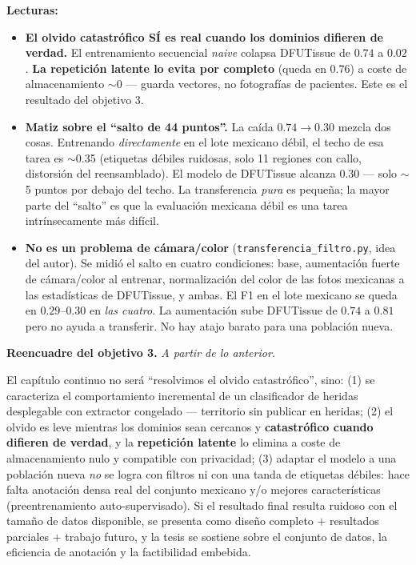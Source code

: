 \documentclass[12pt,letterpaper]{report}
\newcommand{\entrada}[2]{%
    \vspace{0.6em}
    \noindent\textbf{#1.} \textit{#2}
    \vspace{0.3em}
    \par
}
\begin{document}
\textbf{Lecturas:}
\begin{itemize}[leftmargin=1.5em]
    \item \textbf{El olvido catastrófico SÍ es real cuando los dominios difieren de verdad.} El
        entrenamiento secuencial \emph{naive} colapsa DFUTissue de $0.74$ a $0.02$. \textbf{La
        repetición latente lo evita por completo} (queda en $0.76$) a coste de almacenamiento
        $\sim$0 --- guarda vectores, no fotografías de pacientes. Este es el resultado del objetivo 3.
    \item \textbf{Matiz sobre el ``salto de 44 puntos''.} La caída $0.74 \to 0.30$ mezcla dos cosas.
        Entrenando \emph{directamente} en el lote mexicano débil, el techo de esa tarea es
        $\sim$0.35 (etiquetas débiles ruidosas, solo 11 regiones con callo, distorsión del
        reensamblado). El modelo de DFUTissue alcanza $0.30$ --- solo $\sim$5 puntos por debajo del
        techo. La transferencia \emph{pura} es pequeña; la mayor parte del ``salto'' es que la
        evaluación mexicana débil es una tarea intrínsecamente más difícil.
    \item \textbf{No es un problema de cámara/color} (\texttt{transferencia\_filtro.py},
        idea del autor). Se midió el salto en cuatro condiciones: base, aumentación fuerte de
        cámara/color al entrenar, normalización del color de las fotos mexicanas a las estadísticas
        de DFUTissue, y ambas. El F1 en el lote mexicano se queda en $0.29$--$0.30$ en \emph{las
        cuatro}. La aumentación sube DFUTissue de $0.74$ a $0.81$ pero no ayuda a transferir. No hay
        atajo barato para una población nueva.
\end{itemize}

\entrada{Reencuadre del objetivo 3}{A partir de lo anterior.}

El capítulo continuo no será ``resolvimos el olvido catastrófico'', sino: (1) se caracteriza el
comportamiento incremental de un clasificador de heridas desplegable con extractor congelado ---
territorio sin publicar en heridas; (2) el olvido es leve mientras los dominios sean cercanos y
\textbf{catastrófico cuando difieren de verdad}, y la \textbf{repetición latente} lo elimina a coste
de almacenamiento nulo y compatible con privacidad; (3) adaptar el modelo a una población nueva
\emph{no} se logra con filtros ni con una tanda de etiquetas débiles: hace falta anotación densa real
del conjunto mexicano y/o mejores características (preentrenamiento auto-supervisado). Si el resultado
final resulta ruidoso con el tamaño de datos disponible, se presenta como diseño completo $+$
resultados parciales $+$ trabajo futuro, y la tesis se sostiene sobre el conjunto de datos, la
eficiencia de anotación y la factibilidad embebida.
\end{document}
